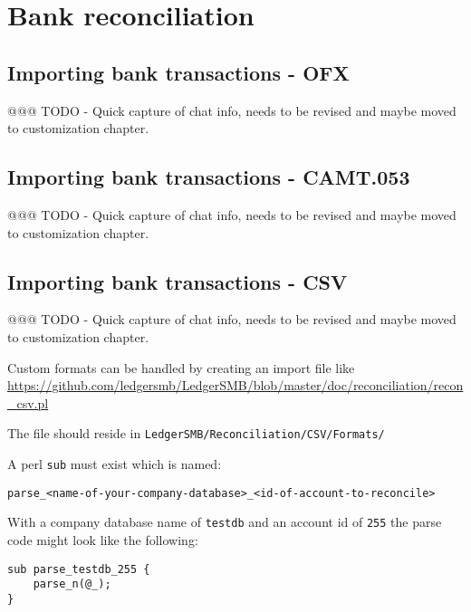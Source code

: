 

\section{Bank reconciliation}
\label{sec-business-processes-accounting-reconciliation}

\subsection{Importing bank transactions - OFX}
\label{subsec-importing-bank-transactions-ofx}

@@@ TODO - Quick capture of chat info, needs to be revised and maybe moved to customization chapter.

\subsection{Importing bank transactions - CAMT.053}
\label{subsec-importing-bank-transactions-camt}

@@@ TODO - Quick capture of chat info, needs to be revised and maybe moved to customization chapter.

\subsection{Importing bank transactions - CSV}
\label{subsec-importing-bank-transactions-csv}


@@@ TODO - Quick capture of chat info, needs to be revised and maybe moved to customization chapter.

Custom formats can be handled by creating an import file
like \url{https://github.com/ledgersmb/LedgerSMB/blob/master/doc/reconciliation/recon_csv.pl}

The file should reside in \texttt{LedgerSMB/Reconciliation/CSV/Formats/}

A perl \texttt{sub} must exist which is named:

\begin{verbatim}
parse_<name-of-your-company-database>_<id-of-account-to-reconcile>
\end{verbatim}

With a company database name of \texttt{testdb} and an account id of \texttt{255} the parse code might look like the following:

\begin{verbatim}
sub parse_testdb_255 {
    parse_n(@_);
}
\end{verbatim}

